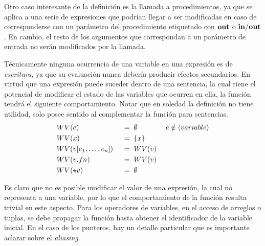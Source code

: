 Otro caso interesante de la definición es la llamada a procedimientos, ya que se aplica a una serie de expresiones que podrían llegar a ser modificadas en caso de corresponderse con un parámetro del procedimiento etiquetado con $\mathbf{out}$ o $\mathbf{in/out}$.
En cambio, el resto de los argumentos que correspondan a un parámetro de entrada no serán modificados por la llamada.

Técnicamente ninguna ocurrencia de una variable en una expresión es de \textit{escritura}, ya que su evaluación nunca debería producir efectos secundarios.
En virtud que una expresión puede suceder dentro de una sentencia, la cual tiene el potencial de modificar el estado de las variables que ocurren en ella, la función tendrá el siguiente comportamiento.
Notar que en soledad la definición no tiene utilidad, solo posee sentido al complementar la función para sentencias.
\begin{alignat*}{3}
&WV(e)
&&\;=\;
\emptyset
&&\;e \notin \langle variable \rangle
\\
&WV(x)
&&\;=\;
\{ x \}
\\
&WV(v [e_1, \ldots, e_n])
&&\;=\;
WV(v)
\\
&WV(v.fn)
&&\;=\;
WV(v)
\\
&WV(\star v)
&&\;=\;
\emptyset
\end{alignat*}

Es claro que no es posible modificar el valor de una expresión, la cual no representa a una variable, por lo que el comportamiento de la función resulta trivial en este aspecto.
Para los operadores de variables, en el acceso de arreglos o tuplas, se debe propagar la función hasta obtener el identificador de la variable inicial.
En el caso de los punteros, hay un detalle particular que es importante aclarar sobre el \textit{aliasing}.

